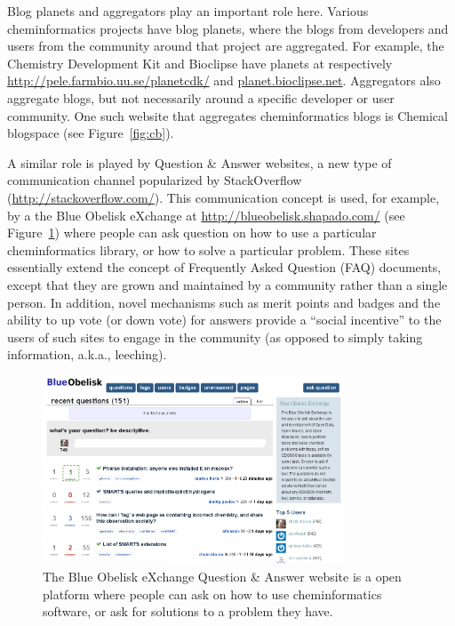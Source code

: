 \documentclass[11pt]{book}
\begin{document}
Blog planets and aggregators play an important role here.
Various cheminformatics projects have blog planets, where
the blogs from developers and users from the community
around that project are aggregated. For example, the
Chemistry Development Kit and Bioclipse have planets
at respectively \url{http://pele.farmbio.uu.se/planetcdk/} and
\url{planet.bioclipse.net}.
Aggregators also aggregate blogs, but not necessarily around
a specific developer or user community. One such website
that aggregates cheminformatics blogs is Chemical blogspace
(see Figure~\ref{fig:cb}).

A similar role is played by Question \& Answer websites, a new
type of communication channel popularized by StackOverflow
(\url{http://stackoverflow.com/}). This communication
concept is used, for example, by a the Blue Obelisk
eXchange at \url{http://blueobelisk.shapado.com/}
(see Figure~\ref{fig:shapado}) where
people can ask question on how to use a particular
cheminformatics library, or how to solve a particular
problem. These sites essentially extend the concept of Frequently
Asked Question (FAQ) documents, except that they are grown and
maintained by a community rather than a single person. In addition,
novel mechanisms such as merit points and badges and the ability to
up vote (or down vote) for answers provide a ``social incentive'' to
the users of such sites to engage in the community (as opposed to
simply taking information, a.k.a., leeching).

\begin{figure}[bt]
\begin{center}
\includegraphics[width=0.8\textwidth]{graphics/boShapado.png}
\end{center}
\caption{The Blue Obelisk eXchange Question \& Answer
website is a open platform where people can ask on how
to use cheminformatics software, or ask for solutions
to a problem they have.}
\label{fig:shapado}
\end{figure}
\end{document}

